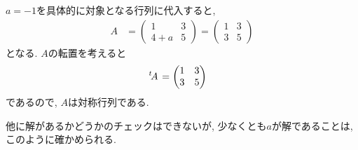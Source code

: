 \begin{checkanswer}%
  $a=-1$を具体的に対象となる行列に代入すると,
  \begin{align*}
    A&=
    \begin{pmatrix}
      1& 3\\
      4+a &5
    \end{pmatrix}=
    \begin{pmatrix}
      1& 3\\
      3 &5
    \end{pmatrix}
  \end{align*}  
  となる. $A$の転置を考えると
  \begin{align*}
    {\left.^{t}\!A\right.}&=
    \begin{pmatrix}
      1& 3\\
      3 &5
  \end{pmatrix}  
  \end{align*}
  であるので, $A$は対称行列である.

  他に解があるかどうかのチェックはできないが,
  少なくとも$a$が解であることは,
  このように確かめられる.
\end{checkanswer}


